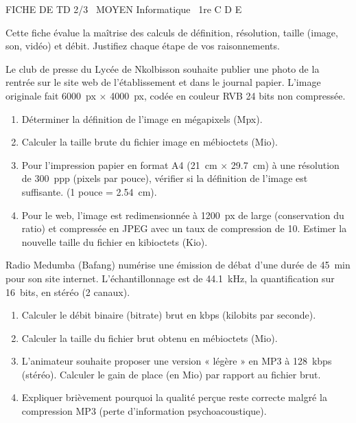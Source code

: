 \documentclass[11pt]{article}
\begin{document}
\begin{tcolorbox}[enhanced,colback=popink,colframe=popink,arc=10pt,boxrule=0pt,left=12pt,right=12pt,top=9pt,bottom=9pt]
{\color{white}\popxbold\small FICHE DE TD 2/3 \textbullet\ MOYEN \hfill Informatique \textbullet\ 1re C D E\par}
\end{tcolorbox}
\vspace{4pt}
Cette fiche évalue la maîtrise des calculs de définition, résolution, taille (image, son, vidéo) et débit. Justifiez chaque étape de vos raisonnements.

\begin{exercice}
Le club de presse du Lycée de Nkolbisson souhaite publier une photo de la rentrée sur le site web de l'établissement et dans le journal papier. L'image originale fait \SI{6000}{px} $\times$ \SI{4000}{px}, codée en couleur RVB 24 bits non compressée.
\begin{enumerate}
    \item Déterminer la définition de l'image en mégapixels (Mpx).
    \item Calculer la taille brute du fichier image en mébioctets (Mio).
    \item Pour l'impression papier en format A4 (\SI{21}{cm} $\times$ \SI{29,7}{cm}) à une résolution de \SI{300}{ppp} (pixels par pouce), vérifier si la définition de l'image est suffisante. (1 pouce = \SI{2,54}{cm}).
    \item Pour le web, l'image est redimensionnée à \SI{1200}{px} de large (conservation du ratio) et compressée en JPEG avec un taux de compression de 10. Estimer la nouvelle taille du fichier en kibioctets (Kio).
\end{enumerate}
\end{exercice}

\begin{exercice}
Radio Medumba (Bafang) numérise une émission de débat d'une durée de \SI{45}{min} pour son site internet. L'échantillonnage est de \SI{44,1}{kHz}, la quantification sur \SI{16}{bits}, en stéréo (2 canaux).
\begin{enumerate}
    \item Calculer le débit binaire (bitrate) brut en kbps (kilobits par seconde).
    \item Calculer la taille du fichier brut obtenu en mébioctets (Mio).
    \item L'animateur souhaite proposer une version « légère » en MP3 à \SI{128}{kbps} (stéréo). Calculer le gain de place (en Mio) par rapport au fichier brut.
    \item Expliquer brièvement pourquoi la qualité perçue reste correcte malgré la compression MP3 (perte d'information psychoacoustique).
\end{enumerate}
\end{exercice}
\end{document}
